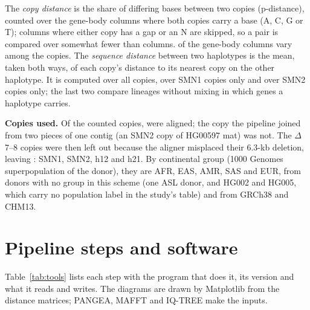 The \emph{copy distance} is the share of differing bases between two copies (p-distance), counted over the
gene-body columns where both copies carry a base (A, C, G or T); columns where either copy has a gap or an N are
skipped, so a pair is compared over somewhat fewer than \nGeneCols{} columns. \nVarCols{} of the gene-body columns
vary among the copies. The \emph{sequence distance} between two haplotypes is the mean,
taken both ways, of each copy's distance to its nearest copy on the other haplotype. It is computed over all copies,
over SMN1 copies only and over SMN2 copies only; the last two compare lineages without mixing in which genes a
haplotype carries.

\textbf{Copies used.} Of the \nCounted{} counted copies, \nAligned{} were aligned; the \nJoined{} copy the pipeline joined from two
pieces of one contig (an SMN2 copy of HG00597 mat) was not. The \nDelLeftOut{} $\Delta$7--8 copies were then left
out because the aligner misplaced their 6.3-kb deletion, leaving \nCopies{}: \nSMNone{} SMN1, \nSMNtwo{} SMN2,
\nHtwelve{} h12 and \nHtwentyone{} h21. By continental group (1000 Genomes superpopulation of the donor), they are
\spAFR{} AFR, \spEAS{} EAS, \spAMR{} AMR, \spSAS{} SAS and \spEUR{} EUR, \spOther{} from donors with no group in this
scheme (one ASL donor, and HG002 and HG005, which carry no population label in the study's table) and \spNone{} from
GRCh38 and CHM13.

\section{Pipeline steps and software}
Table~\ref{tab:tools} lists each step with the program that does it, its version and what it reads
and writes. The diagrams are drawn by Matplotlib from the distance matrices; PANGEA, MAFFT and IQ-TREE make the
inputs.

